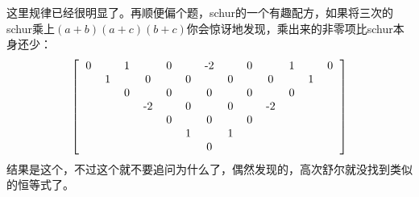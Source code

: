 \documentclass[UTF8]{ctexart}
\begin{document}
这里规律已经很明显了。再顺便偏个题，schur的一个有趣配方，如果将三次的schur乘上$ (a+b)(a+c)(b+c) $你会惊讶地发现，乘出来的非零项比schur本身还少：
\renewcommand*{\arraystretch}{1.732}\[\left[\begin{matrix}
	\begin{tabular}{ccccccccccccc}
		0& &1& &0& &-2& &0& &1& &0\\
		&1& &0& &0& &0& &0& &1&\\
		& &0& &0& &0& &0& &0& &\\
		& & &-2& &0& &0& &-2& & &\\
		& & & &0& &0& &0& & & &\\
		& & & & &1& &1& & & & &\\
		& & & & & &0& & & & & &\\
	\end{tabular}
\end{matrix}\right]\]
结果是这个，不过这个就不要追问为什么了，偶然发现的，高次舒尔就没找到类似的恒等式了。
\end{document}
